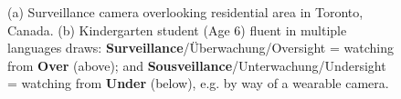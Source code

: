 \begin{figure}[t!]
  \caption{
           (a) Surveillance camera overlooking residential area in
               Toronto, Canada.
           (b) Kindergarten student (Age 6) fluent in multiple languages draws: %
           {\bf Surveillance}/Überwachung/Oversight =
           watching from {\bf Over} (above); and
           {\bf Sousveillance}/Unterwachung/Undersight =
           watching from {\bf Under} (below),
           e.g. by way of a wearable camera.
  }
  \label{fig:surveillance}
\end{figure}




%

